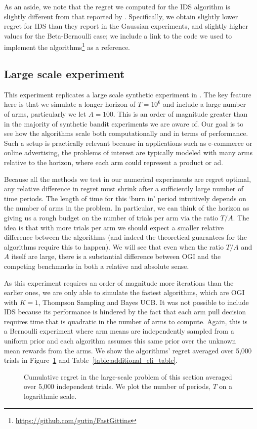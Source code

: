 As an aside, we note that the regret we computed for the IDS algorithm is slightly different from that reported by \cite{russo2014learning}. Specifically, we obtain slightly lower regret for IDS than they report in the Gaussian experiments, and slightly higher values for the Beta-Bernoulli case; we include a link to the code we used to implement the algorithms\footnote{\url{https://github.com/gutin/FastGittins}} as a reference.  

\subsection{Large scale experiment} \label{exp:ts_sampling_experiment}
This experiment replicates a large scale synthetic experiment in \cite{chapelle2011empirical}.
The key feature here is that we simulate a  longer horizon of $T = 10^6$ and include a large number of arms, particularly we let $A = 100$. This is an order of magnitude greater than in the majority of synthetic bandit experiments we are aware of.
Our goal is to see how the algorithms scale both computationally and in terms of performance.
Such a setup is practically relevant because in applications such as e-commerce or online advertising, the problems of interest are typically modeled with many arms relative to the horizon, where each arm could represent a product or ad.

Because all the methods we test in our numerical experiments are regret optimal, any relative difference in regret must shrink after a sufficiently large number of time periods. The length of time for this `burn in' period intuitively depends on the number of arms in the problem.
In particular, we can think of the horizon as giving us a rough budget on the number of trials per arm via the ratio $T/A$.
The idea is that with more trials per arm we should expect a smaller relative difference between the algorithms {\color{blue}(and indeed the theoretical guarantees for the algorithms require this to happen)}. 
We will see that even when the ratio $T/A$ and $A$ itself are large, there is a substantial difference between OGI and the competing benchmarks in both a relative and absolute sense.

As this experiment requires an order of magnitude more iterations than the earlier ones, we are only able to simulate the fastest algorithms, which are OGI with $K=1$, Thompson Sampling and Bayes UCB. 
It was not possible to include IDS because its performance is hindered by the fact that each arm pull decision requires time that is quadratic in the number of arms to compute. 
Again, this is a Bernoulli experiment where arm means are independently sampled from a uniform prior and each algorithm assumes this same prior over the unknown mean rewards from the arms.
We show the algorithms' regret averaged over 5,000 trials in Figure~\ref{fig:chapelle_and_li} and Table~\ref{table:additional_cli_table}.
\begin{figure}[h!]
	\centering
	
	\caption{Cumulative regret in the large-scale problem of this section averaged over 5,000 independent trials.
		We plot the number of periods, $T$ on a logarithmic scale.}
	\label{fig:chapelle_and_li}
\end{figure}

